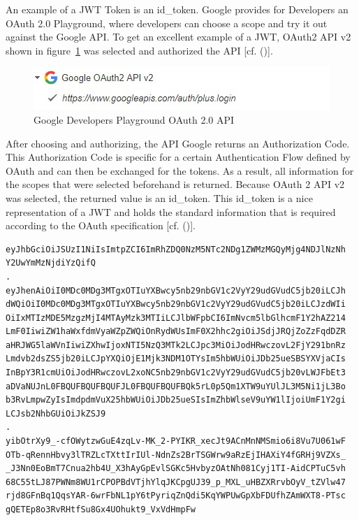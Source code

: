 An example of a JWT Token is an id\_token. Google provides for Developers an OAuth 2.0 Playground, where developers can choose a scope and try it out against the Google API. To get an excellent example of a JWT, OAuth2 API v2 shown in figure~\ref{fig:googleoauthplaygroundoauthapi} was selected and authorized the API [cf. (\cite{Google:2018:OAuthPlayground})].


\begin{figure}[h]
	\centering
	\includegraphics[width=0.8\linewidth]{images/googleOAuthPlaygroundOAuthAPI}
	\caption[OAuth API]{Google Developers Playground OAuth 2.0 API}
	\label{fig:googleoauthplaygroundoauthapi}
\end{figure}

After choosing and authorizing, the API Google returns an Authorization Code. This Authorization Code is specific for a certain Authentication Flow defined by OAuth and can then be exchanged for the tokens. As a result, all information for the scopes that were selected beforehand is returned. Because OAuth 2 API v2 was selected, the returned value is an id\_token. This id\_token is a nice representation of a JWT and holds the standard information that is required according to the OAuth specification  [cf. (\cite{Google:2018:OAuthPlayground})].


\begin{lstlisting}
eyJhbGciOiJSUzI1NiIsImtpZCI6ImRhZDQ0NzM5NTc2NDg1ZWMzMGQyMjg4NDJlNzNh
Y2UwYmMzNjdiYzQifQ
.
eyJhenAiOiI0MDc0MDg3MTgxOTIuYXBwcy5nb29nbGV1c2VyY29udGVudC5jb20iLCJh
dWQiOiI0MDc0MDg3MTgxOTIuYXBwcy5nb29nbGV1c2VyY29udGVudC5jb20iLCJzdWIi
OiIxMTIzMDE5MzgzMjI4MTAyMzk3MTIiLCJlbWFpbCI6ImNvcm5lbGlhcmF1Y2hAZ214
LmF0IiwiZW1haWxfdmVyaWZpZWQiOnRydWUsImF0X2hhc2giOiJSdjJRQjZoZzFqdDZR
aHRJWG5laWVnIiwiZXhwIjoxNTI5NzQ3MTk2LCJpc3MiOiJodHRwczovL2FjY291bnRz
Lmdvb2dsZS5jb20iLCJpYXQiOjE1Mjk3NDM1OTYsIm5hbWUiOiJDb25ueSBSYXVjaCIs
InBpY3R1cmUiOiJodHRwczovL2xoNC5nb29nbGV1c2VyY29udGVudC5jb20vLWJFbEt3
aDVaNUJnL0FBQUFBQUFBQUFJL0FBQUFBQUFBQk5rL0p5Qm1XTW9uYUlJL3M5Ni1jL3Bo
b3RvLmpwZyIsImdpdmVuX25hbWUiOiJDb25ueSIsImZhbWlseV9uYW1lIjoiUmF1Y2gi
LCJsb2NhbGUiOiJkZSJ9
.
yibOtrXy9_-cfOWytzwGuE4zqLv-MK_2-PYIKR_xecJt9ACnMnNMSmio6i8Vu7U061wF
OTb-qRennHbvy3lTRZLcTXttIrIUl-NdnZs2BrTSGWrw9aRzEjIHAXiY4fGRHj9VZXs_
_J3Nn0EoBmT7Cnua2hb4U_X3hAyGpEvlSGKc5HvbyzOAtNh081Cyj1TI-AidCPTuC5vh
68C55tLJ87PWNm8WU1rCPOPBdVTjhYlqJKCpgUJ39_p_MXL_uHBZXRrvbOyV_tZVlw47
rjd8GFnBq1QqsYAR-6wrFbNL1pY6tPyriqZnQdi5KqYWPUwGpXbFDUfhZAmWXT8-PTsc
gQETEp8o3RvRHtfSu8Gx4UOhukt9_VxVdHmpFw
\end{lstlisting}


